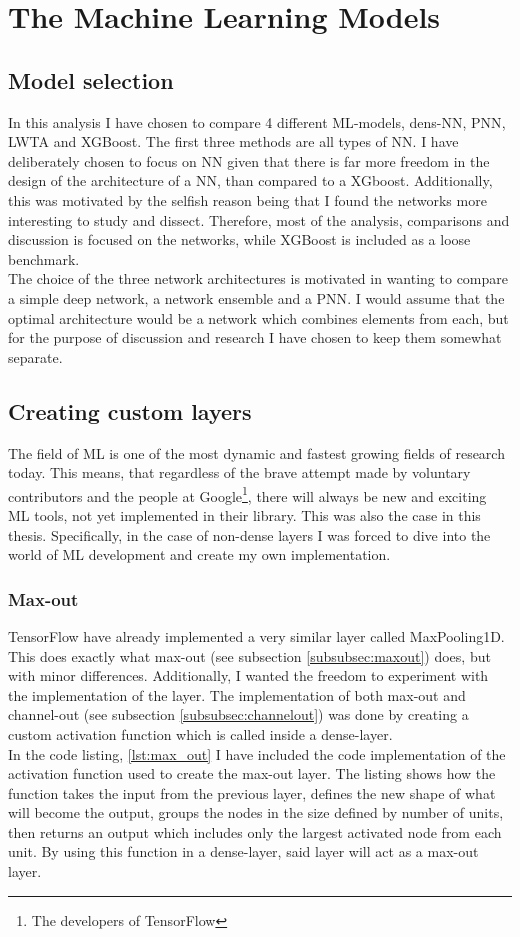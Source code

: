\section{The Machine Learning Models}
\subsection{Model selection}
In this analysis I have chosen to compare 4 different \ac{ML}-models, dens-\acf{NN}, \acf{PNN},
\ac{LWTA} and XGBoost. The first three methods are all types of \ac{NN}. I have deliberately 
chosen to focus on \ac{NN} given that there is far more freedom in the design of the architecture
of a \ac{NN}, than compared to a XGboost. Additionally, this was motivated by the selfish reason
being that I found the networks more interesting to study and dissect. Therefore, most of the 
analysis, comparisons and discussion is focused on the networks, while XGBoost is included 
as a loose benchmark. 
\\
The choice of the three network architectures is motivated in wanting to compare a simple 
deep network, a network ensemble and a \ac{PNN}. I would assume that the optimal architecture
would be a network which combines elements from each, but for the purpose of discussion
and research I have chosen to keep them somewhat separate. 
\subsection{Creating custom layers}\label{subsec:CustomLayer}
The field of \ac{ML} is one of the most dynamic and fastest growing fields of research
today. This means, that regardless of the brave attempt made by voluntary contributors and
the people at Google\footnote{The developers of TensorFlow}, there will always be 
new and exciting \ac{ML} tools, not yet implemented in their library. This was also 
the case in this thesis. Specifically, in the case of non-dense layers I was forced
to dive into the world of \ac{ML} development and create my own implementation. 
\subsubsection*{Max-out}
TensorFlow have already implemented a very similar layer called MaxPooling1D. This does 
exactly what max-out (see subsection \ref{subsubsec:maxout}) does, but with minor differences. 
Additionally, I wanted the freedom to experiment with the implementation of the layer. The 
implementation of both max-out and channel-out (see subsection \ref{subsubsec:channelout}) 
was done by creating a custom activation function which is called inside a dense-layer. 
\\
In the code listing, \ref{lst:max_out} I have included the code implementation of the
activation function used to create the max-out layer. The listing shows how the function
takes the input from the previous layer, defines the new shape of what will become the 
output, groups the nodes in the size defined by number of units, then returns an output 
which includes only the largest activated node from each unit. By using this function 
in a dense-layer, said layer will act as a max-out layer. 

